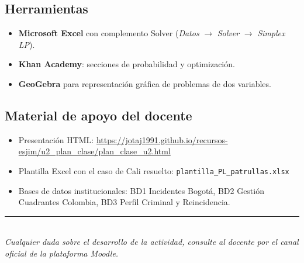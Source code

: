 \documentclass[11pt, a4paper]{article}
\begin{document}
\subsection{Herramientas}
\begin{itemize}[leftmargin=1.5em]
\item \textbf{Microsoft Excel} con complemento Solver (\textit{Datos} $\rightarrow$ \textit{Solver} $\rightarrow$ \textit{Simplex LP}).
\item \textbf{Khan Academy}: secciones de probabilidad y optimizaci\'on.
\item \textbf{GeoGebra} para representaci\'on gr\'afica de problemas de dos variables.
\end{itemize}

\subsection{Material de apoyo del docente}
\begin{itemize}[leftmargin=1.5em]
\item Presentaci\'on HTML: \url{https://jotaj1991.github.io/recursos-esjim/u2_plan_clase/plan_clase_u2.html}
\item Plantilla Excel con el caso de Cali resuelto: \texttt{plantilla\_PL\_patrullas.xlsx}
\item Bases de datos institucionales: BD1 Incidentes Bogot\'a, BD2 Gesti\'on Cuadrantes Colombia, BD3 Perfil Criminal y Reincidencia.
\end{itemize}

\vspace{1cm}

\begin{center}
\color{policiaAzul}\rule{0.6\textwidth}{0.6pt}\\[8pt]
\footnotesize\textit{Cualquier duda sobre el desarrollo de la actividad, consulte al docente por el canal oficial de la plataforma Moodle.}
\end{center}
\end{document}
